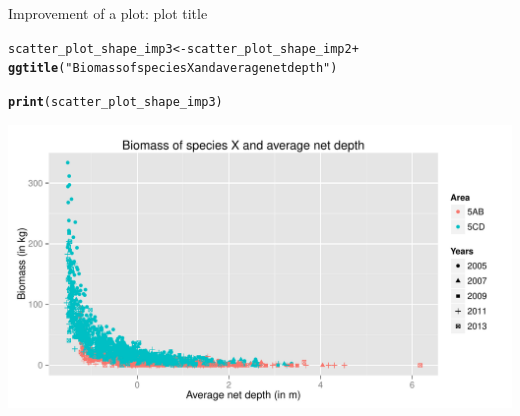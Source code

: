 \documentclass{beamer}\usepackage[]{graphicx}\usepackage[]{color}
\makeatletter
\newcommand{\hlstr}[1]{\textcolor[rgb]{0.192,0.494,0.8}{#1}}%
\newcommand{\hlopt}[1]{\textcolor[rgb]{0,0,0}{#1}}%
\newcommand{\hlstd}[1]{\textcolor[rgb]{0.345,0.345,0.345}{#1}}%
\newcommand{\hlkwb}[1]{\textcolor[rgb]{0.69,0.353,0.396}{#1}}%
\newcommand{\hlkwd}[1]{\textcolor[rgb]{0.737,0.353,0.396}{\textbf{#1}}}%
\newenvironment{kframe}{%
 \def\at@end@of@kframe{}%
 \ifinner\ifhmode%
  \def\at@end@of@kframe{\end{minipage}}%
  \begin{minipage}{\columnwidth}%
 \fi\fi%
 \def\FrameCommand##1{\hskip\@totalleftmargin \hskip-\fboxsep
 \colorbox{shadecolor}{##1}\hskip-\fboxsep
     \hskip-\linewidth \hskip-\@totalleftmargin \hskip\columnwidth}%
 \MakeFramed {\advance\hsize-\width
   \@totalleftmargin\z@ \linewidth\hsize
   \@setminipage}}%
 {\par\unskip\endMakeFramed%
 \at@end@of@kframe}
\newenvironment{knitrout}{}{} %
\makeatother
\begin{document}
\begin{frame}[fragile]{Improvement of a plot: plot title}
\begin{knitrout}\footnotesize
{}\color{fgcolor}\begin{kframe}
\begin{alltt}
  \hlstd{scatter_plot_shape_imp3} \hlkwb{<-} \hlstd{scatter_plot_shape_imp2} \hlopt{+}
   \hlkwd{ggtitle}\hlstd{(}\hlstr{"Biomass of species X and average net depth"}\hlstd{)}

  \hlkwd{print}\hlstd{(scatter_plot_shape_imp3)}
\end{alltt}
\end{kframe}

{\centering \includegraphics[width=.9\linewidth]{figure/scatter_plot_shape_imp3-1} 

}



\end{knitrout}
\end{frame}
\end{document}

